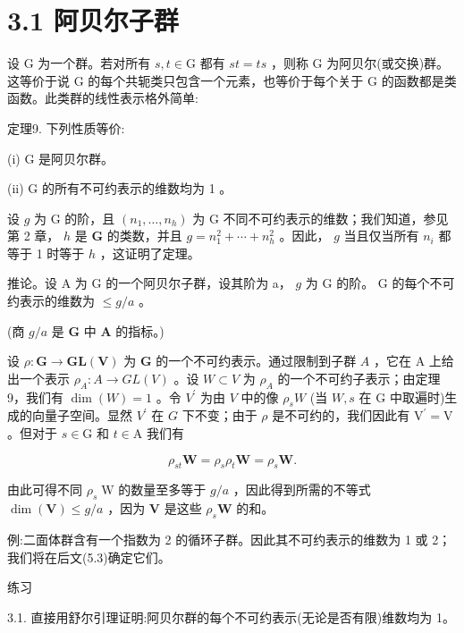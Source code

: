 \documentclass[10pt]{article}
\begin{document}
\section*{3.1 阿贝尔子群}

设 \(\mathrm{G}\) 为一个群。若对所有 \(s,t \in  \mathrm{G}\) 都有 \({st} = {ts}\) ，则称 \(\mathrm{G}\) 为阿贝尔(或交换)群。这等价于说 \(\mathrm{G}\) 的每个共轭类只包含一个元素，也等价于每个关于 \(\mathrm{G}\) 的函数都是类函数。此类群的线性表示格外简单:

定理9. 下列性质等价:

(i) \(\mathrm{G}\) 是阿贝尔群。

(ii) \(\mathrm{G}\) 的所有不可约表示的维数均为 1 。

设 \(g\) 为 \(\mathrm{G}\) 的阶，且 \(\left( {{n}_{1},\ldots ,{n}_{h}}\right)\) 为 \(\mathrm{G}\) 不同不可约表示的维数；我们知道，参见第 2 章， \(h\) 是 \(\mathbf{G}\) 的类数，并且 \(g = {n}_{1}^{2} + \cdots  + {n}_{h}^{2}\) 。因此， \(g\) 当且仅当所有 \({n}_{i}\) 都等于 1 时等于 \(h\) ，这证明了定理。

推论。设 \(\mathrm{A}\) 为 \(\mathrm{G}\) 的一个阿贝尔子群，设其阶为 a， \(g\) 为 \(\mathrm{G}\) 的阶。 \(\mathrm{G}\) 的每个不可约表示的维数为 \(\leq  g/a\) 。

(商 \(g/a\) 是 \(\mathbf{G}\) 中 \(\mathbf{A}\) 的指标。)

设 \(\rho  : \mathbf{G} \rightarrow  \mathbf{{GL}}\left( \mathbf{V}\right)\) 为 \(\mathbf{G}\) 的一个不可约表示。通过限制到子群 \(A\) ，它在 A 上给出一个表示 \({\rho }_{A} : A \rightarrow  {GL}\left( V\right)\) 。设 \(W \subset  V\) 为 \({\rho }_{A}\) 的一个不可约子表示；由定理 9，我们有 \(\dim \left( W\right)  = 1\) 。令 \({V}^{\prime }\) 为由 \(V\) 中的像 \({\rho }_{s}W\) (当 \(W,s\) 在 G 中取遍时)生成的向量子空间。显然 \({V}^{\prime }\) 在 \(G\) 下不变；由于 \(\rho\) 是不可约的，我们因此有 \({\mathrm{V}}^{\prime } = \mathrm{V}\) 。但对于 \(s \in  \mathrm{G}\) 和 \(t \in  \mathrm{A}\) 我们有

\[
{\rho }_{st}\mathbf{W} = {\rho }_{s}{\rho }_{t}\mathbf{W} = {\rho }_{s}\mathbf{W}.
\]

由此可得不同 \({\rho }_{s}\mathrm{\;W}\) 的数量至多等于 \(g/a\) ，因此得到所需的不等式 \(\dim \left( \mathbf{V}\right)  \leq  g/a\) ，因为 \(\mathbf{V}\) 是这些 \({\rho }_{s}\mathbf{W}\) 的和。

例:二面体群含有一个指数为 2 的循环子群。因此其不可约表示的维数为 1 或 2；我们将在后文(5.3)确定它们。

练习

3.1. 直接用舒尔引理证明:阿贝尔群的每个不可约表示(无论是否有限)维数均为 1。
\end{document}
